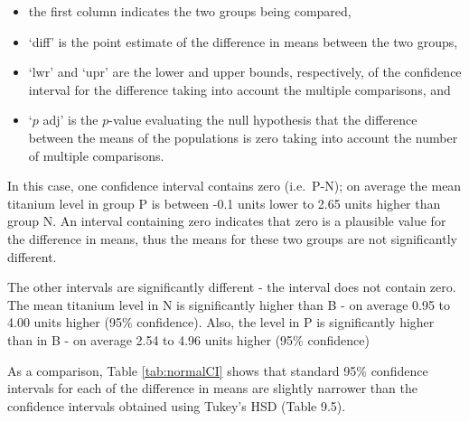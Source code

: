 \documentclass[
  oneside]{krantz}
\begin{document}
\begin{itemize}
\item
  the first column indicates the two groups being compared,
\item
  `diff' is the point estimate of the difference in means between the two groups,
\item
  `lwr' and `upr' are the lower and upper bounds, respectively, of the confidence interval for the difference taking into account the multiple comparisons, and
\item
  `\(p\) adj' is the \(p\)-value evaluating the null hypothesis that the difference between the means of the populations is zero taking into account the number of multiple comparisons.
\end{itemize}

In this case, one confidence interval contains zero (i.e.~P-N); on average the mean titanium level in group P is between -0.1 units lower to 2.65 units higher than group N. An interval containing zero indicates that zero is a plausible value for the difference in means, thus the means for these two groups are not significantly different.

The other intervals are significantly different - the interval does not contain zero. The mean titanium level in N is significantly higher than B - on average 0.95 to 4.00 units higher (95\% confidence). Also, the level in P is significantly higher than in B - on average 2.54 to 4.96 units higher (95\% confidence)

As a comparison, Table \ref{tab:normalCI} shows that standard 95\% confidence intervals for each of the difference in means are slightly narrower than the confidence intervals obtained using Tukey's HSD (Table 9.5).
\end{document}
